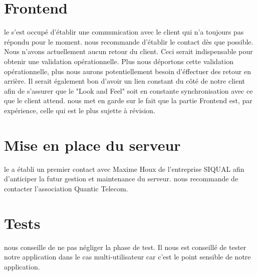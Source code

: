 \documentclass [a4paper] {article}
\begin{document}
\section{Frontend}
le \CP{} s'est occupé d'établir une communication avec le client qui n'a toujours pas répondu pour le moment. \nomTuteurPedago{} nous recommande d'établir le contact dès que possible. Nous n'avons actuellement aucun retour du client. Ceci serait indispensable pour obtenir une validation opérationnelle. Plus nous déportons cette validation opérationnelle, plus nous aurons potentiellement besoin d'éffectuer des retour en arrière. Il serait également bon d'avoir un lien constant du côté de notre client afin de s'assurer que le "Look and Feel" soit en constante synchronisation avec ce que le client attend. \nomTuteurPedago{} nous met en garde sur le fait que la partie Frontend est, par expérience, celle qui est le plus sujette à révision.

\section{Mise en place du serveur}
le \CP{} a établi un premier contact avec Maxime Houx de l'entreprise SIQUAL afin d'anticiper la futur gestion et maintenance du serveur. \nomTuteurPedago{} nous recommande de contacter l'association Quantic Telecom.

\section{Tests}
\nomTuteurPedago{} nous conseille de ne pas négliger la phase de test. Il nous est conseillé de tester notre application dans le cas multi-utilisateur car c'est le point sensible de notre application.


\newpage
\end{document}
